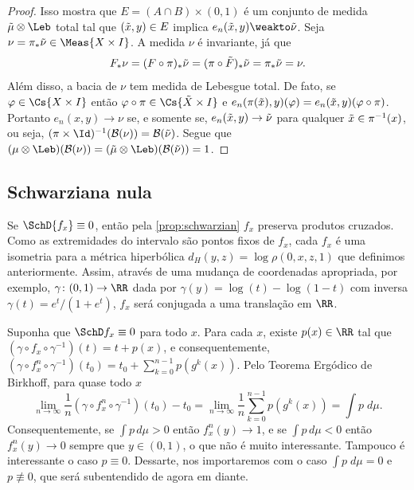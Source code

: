 \documentclass[../fapesp0]{subfiles}
\begin{document}
\begin{proof}
  Isso mostra que \(E = (A \cap B) \times (0,1)\) é um conjunto de medida \(\emu \otimes \Leb\) total tal que \((\tilde x, y) \in E\) implica \(e_n(\ex, y) \weakto \enu\). Seja \(\nu = \pi_* \enu \in \Meas{X \times I}\). A medida \(\nu\) é invariante, já que
  \[F_* \nu = (F \circ \pi)_* \tilde \nu = (\pi \circ \tilde F)_* \tilde \nu = \pi_*\tilde \nu = \nu.\]
  Além disso, a bacia de \(\nu\) tem medida de Lebesgue total. De fato, se \(\varphi \in \Cs{X \times I}\) então \(\varphi \circ \pi \in \Cs{\eX \times I}\) e \(e_n(\pi(\tilde x), y)(\varphi) = e_n(\tilde x,y)(\varphi \circ \pi)\). Portanto \(e_n(x,y) \to \nu\) se, e somente se, \(e_n(\tilde x, y) \to \tilde \nu\) para qualquer \(\tilde x \in \pi ^{-1}(x)\), ou seja, \((\pi \times \Id)^{-1}(\mathcal{B}(\nu)) = \mathcal{B}(\enu)\). Segue que \((\mu \otimes \Leb)(\mathcal{B}(\nu)) = (\emu \otimes \Leb)(\mathcal{B}(\enu)) = 1\).
\end{proof}

\subsection{Schwarziana nula}
Se \(\SchD{f_x} \equiv 0\), então pela \cref{prop:schwarzian} \(f_x\) preserva produtos cruzados. Como as extremidades do intervalo são pontos fixos de \(f_x\), cada \(f_x\) é uma isometria para a métrica hiperbólica \(d_H(y,z) = \log \rho(0,x,z,1)\) que definimos anteriormente. Assim, através de uma mudança de coordenadas apropriada, por exemplo, \(\gamma \colon (0,1) \to \RR\) dada por \(\gamma(y) = \log(t) - \log(1 - t)\) com inversa \(\gamma(t) = e^t/(1 + e^t)\), \(f_x\) será conjugada a uma translação em \(\RR\).

Suponha que \(\SchD f_x \equiv 0\) para todo \(x\). Para cada \(x\), existe \(p(x) \in \RR\) tal que \((\gamma \circ f_x \circ \gamma ^{-1})(t) = t + p(x)\), e consequentemente, \((\gamma \circ f_x^n \circ \gamma ^{-1})(t_0) = t_0 + \sum_{k = 0}^{n - 1} p(g^k(x))\). Pelo Teorema Ergódico de Birkhoff, para quase todo \(x\)
\[\lim_{n \to \infty}\frac{1}{n}(\gamma \circ f_x^n \circ \gamma ^{-1})(t_0) - t_0 = \lim_{n \to \infty} \frac{1}{n} \sum_{k = 0}^{n - 1} p(g^k(x)) = \int p \;d\mu.\]
Consequentemente, se \(\int p \,d\mu > 0\) então \(f_x^n(y) \to 1\), e se \(\int p \,d\mu < 0\) então \(f_x^n(y) \to 0\) sempre que \(y \in (0,1)\), o que não é muito interessante. Tampouco é interessante o caso \(p \equiv 0\). Dessarte, nos importaremos com o caso \(\int p \;d\mu = 0\) e \(p \not\equiv 0\), que será subentendido de agora em diante.
\end{document}

